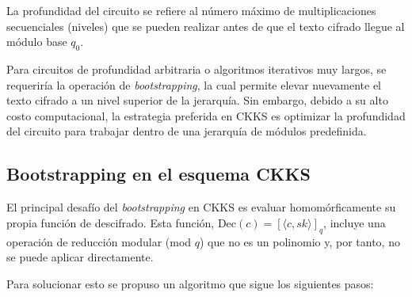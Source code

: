 La profundidad del circuito se refiere al número máximo de multiplicaciones secuenciales (niveles) que se pueden realizar antes de que el texto cifrado llegue al módulo base $q_0$.

Para circuitos de profundidad arbitraria o algoritmos iterativos muy largos, se requeriría la operación de \textit{bootstrapping}, la cual permite elevar nuevamente el texto cifrado a un nivel superior de la jerarquía. Sin embargo, debido a su alto costo computacional, la estrategia preferida en CKKS es optimizar la profundidad del circuito para trabajar dentro de una jerarquía de módulos predefinida.

\subsection{Bootstrapping en el esquema CKKS}

El principal desafío del \textit{bootstrapping} en CKKS es evaluar homomórficamente su propia función de descifrado. Esta función, $\text{Dec}(c) = [\langle c, sk \rangle]_q$, incluye una operación de reducción modular (mod $q$) que no es un polinomio y, por tanto, no se puede aplicar directamente.

Para solucionar esto se propuso un algoritmo \cite{CKKS17-Boot} que sigue los siguientes pasos:

